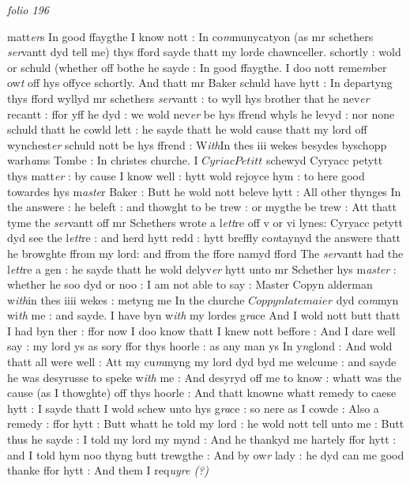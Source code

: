 \documentclass[12pt, a4paper]{book}
\begin{document}
\dotfill
					

\textit{folio 196}
      				
      				
      				matt\textit{er}s In good ffaygthe I know nott : In co\textit{m}munycatyon (as mr schethers \textit{ser}vantt dyd tell me) thys fford sayde thatt my lorde chawnceller. schortly : wold or schuld (whether off bothe he sayde : In good ffaygthe. I doo nott reme\textit{m}ber ow\textit{t} off hys offyce schortly. And thatt mr Baker schuld have hytt : In departyng thys fford wyllyd mr schethers \textit{ser}vantt : to wyll hys brother that he nev\textit{er} recantt : ffor yff he dyd : we wold nev\textit{er} be hys ffrend whyls he levyd : nor none schuld thatt he cowld lett : he sayde thatt he wold cause thatt my lord off wynchest\textit{er} schuld nott be hys ffrend : W\textit{ith}In thes iii wekes besydes byschopp warh\textit{a}ms Tombe : In christes churche. I $Cyriac Petitt$ schewyd Cyryacc petytt thys matt\textit{er} : by cause I know well : hytt wold rejoyce hym : to here good towardes hys m\textit{aste}r Baker : Butt he wold nott beleve hytt : All other thynges In the answere : he beleft : and thowght to be trew : or mygthe be trew : Att thatt tyme the \textit{ser}vantt off mr Schethers wrote a l\textit{ett}re off v or vi lynes: Cyryacc petytt dyd see the l\textit{ett}re : and herd hytt redd : hytt breffly co\textit{n}taynyd the answere thatt he browghte ffrom my lord: and ffrom the ffore namyd fford The \textit{ser}vantt had the l\textit{ett}re a gen : he sayde thatt he wold delyv\textit{er} hytt unto mr Schether hys m\textit{aster} : whether he soo dyd or noo : I am not able to say : Master Copyn alderman w\textit{ith}in thes iiii wekes : metyng me In the churche $Coppyn late maier$ dyd co\textit{m}myn wi\textit{th} me : and sayde. I have byn w\textit{ith} my lordes g\textit{ra}ce And I wold nott butt thatt I had byn ther : ffor now I doo know thatt I knew nott beffore : And I dare well say : my lord ys as sory ffor thys hoorle : as any man ys In y\textit{n}glond : And wold thatt all were well : Att my cu\textit{m}myng my lord dyd byd me welcume : and sayde he was desyrusse to speke w\textit{ith} me : And desyryd off me to know : whatt was the cause (as I  thowghte) off thys hoorle : And thatt knowne whatt remedy to caese hytt : I sayde thatt I wold schew unto hys g\textit{ra}ce : so nere as I cowde : Also a remedy : ffor hytt : Butt whatt he told my lord : he wold nott tell unto me : Butt thus he sayde : I told my lord my mynd : And he thankyd me hartely ffor hytt : and I told hym noo thyng butt trewgthe : And  by ow\textit{r} lady : he dyd can me good thanke ffor hytt : And them I req\textit{uyre (?)}
      				
\end{document}
